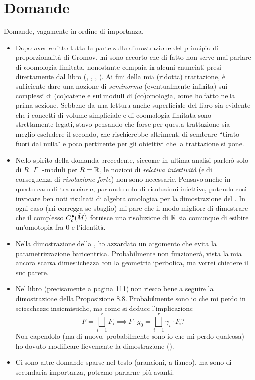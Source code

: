 \section*{Domande}
Domande, vagamente in ordine di importanza.
\begin{itemize}
\item Dopo aver scritto tutta la parte sulla dimostrazione del principio di proporzionalità di Gromov, mi sono accorto che di fatto non serve mai parlare di coomologia limitata, nonostante compaia in alcuni enunciati presi direttamente dal libro (, , , ). Ai fini della mia (ridotta) trattazione, è sufficiente dare una nozione di \emph{seminorma} (eventualmente infinita) sui complessi di (co)catene e sui moduli di (co)omologia, come ho fatto nella prima sezione. Sebbene da una lettura anche superficiale del libro sia evidente che i concetti di volume simpliciale e di coomologia limitata sono strettamente legati, stavo pensando che forse per questa trattazione sia meglio escludere il secondo, che rischierebbe altrimenti di sembrare ``tirato fuori dal nulla" e poco pertinente per gli obiettivi che la trattazione si pone.
\item Nello spirito della domanda precedente, siccome in ultima analisi parlerò solo di $R[\Gamma]$-moduli per $R=\mathbb{R}$, le nozioni di \emph{relativa iniettività} (e di conseguenza di \emph{risoluzione forte}) non sono necessarie. Pensavo anche in questo caso di tralasciarle, parlando solo di risoluzioni iniettive, potendo così invocare ben noti risultati di algebra omologica per la dimostrazione del . In ogni caso (mi corregga se sbaglio) mi pare che il modo migliore di dimostrare che il complesso $C^\bullet_c(\widetilde M)$ fornisce una risoluzione di $\mathbb{R}$ sia comunque di esibire un'omotopia fra $0$ e l'identità.
\item Nella dimostrazione della , ho azzardato un argomento che evita la parametrizzazione baricentrica. Probabilmente non funzionerà, vista la mia ancora scarsa dimestichezza con la geometria iperbolica, ma vorrei chiedere il suo parere.
\item Nel libro (precisamente a pagina 111) non riesco bene a seguire la dimostrazione della Proposizione 8.8. Probabilmente sono io che mi perdo in sciocchezze insiemistiche, ma come si deduce l'implicazione
\[
F=\bigsqcup_{i=1}^r F_i\implies F\cdot g_0=\bigsqcup_{i=1}^r \gamma_i\cdot F_i?
\]
Non capendolo (ma di nuovo, probabilmente sono io che mi perdo qualcosa) ho dovuto modificare lievemente la dimostrazione ().
\item Ci sono altre domande sparse nel testo (arancioni, a fianco), ma sono di secondaria importanza, potremo parlarne più avanti.
\end{itemize}